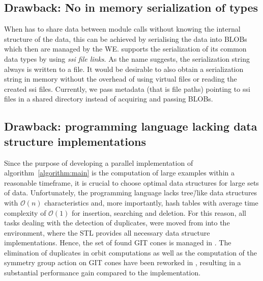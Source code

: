 \subsection*{Drawback: No in memory serialization of \singular{} types}
When \gpispace{} has to share \singular{} data between module calls without knowing the internal structure of the data, this can be achieved by serialising the data into \acp{BLOB} which then are managed by the \ac{WE}. \singular{} supports the serialization of its common data types by using \emph{\ac{ssi} file links}. As the name suggests, the serialization string always is written to a file. It would be desirable to also obtain a serialization string in memory without the overhead of using virtual files or reading the created \ac{ssi} files. Currently, we pass metadata (that is file paths) pointing to \ac{ssi} files in a shared directory instead of acquiring and passing \acp{BLOB}.

\subsection*{Drawback: \singular{} programming language lacking data structure implementations}
Since the purpose of developing a parallel implementation of algorithm~\ref{algorithm:main} is the computation of large examples within a reasonable timeframe, it is crucial to choose optimal data structures for large sets of data. Unfortunately, the \singular{} programming language lacks tree\=/like data structures with $\mathcal{O}(n)$ characteristics and, more importantly, hash tables with average time complexity of $\mathcal{O}(1)$ for insertion, searching and deletion. For this reason, all tasks dealing with the detection of duplicates, were moved from \singular{} into the \cplusplus{} environment, where the \ac{STL} provides all necessary data structure implementations. Hence, the set of found GIT cones is managed in \cplusplus{}. The elimination of duplicates in orbit computations as well as the computation of the symmetry group action on GIT cones have been reworked in \cplusplus{}, resulting in a substantial performance gain compared to the \gitfanlib{} implementation.


